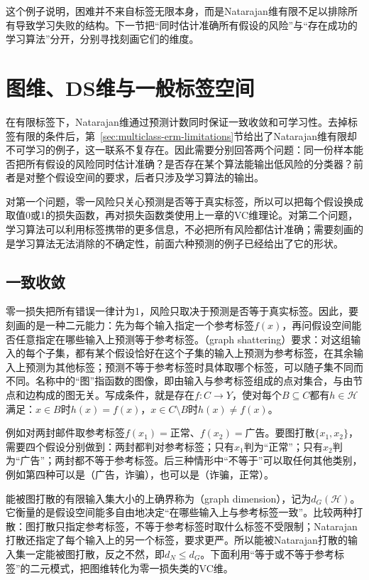 这个例子说明，困难并不来自标签无限本身，而是Natarajan维有限不足以排除所有导致学习失败的结构。下一节把“同时估计准确所有假设的风险”与“存在成功的学习算法”分开，分别寻找刻画它们的维度。

\section{图维、DS维与一般标签空间}
\label{sec:general-multiclass-dimensions}
\label{sec:multiclass-sample-complexity}
在有限标签下，Natarajan维通过预测计数同时保证一致收敛和可学习性。去掉标签有限的条件后，第~\ref{sec:multiclass-erm-limitations}节给出了Natarajan维有限却不可学习的例子，这一联系不复存在。因此需要分别回答两个问题：同一份样本能否把所有假设的风险同时估计准确？是否存在某个算法能输出低风险的分类器？前者是对整个假设空间的要求，后者只涉及学习算法的输出。

对第一个问题，零一风险只关心预测是否等于真实标签，所以可以把每个假设换成取值0或1的损失函数，再对损失函数类使用上一章的VC维理论。对第二个问题，学习算法可以利用标签携带的更多信息，不必把所有风险都估计准确；需要刻画的是学习算法无法消除的不确定性，前面六种预测的例子已经给出了它的形状。

\subsection{一致收敛}

零一损失把所有错误一律计为1，风险只取决于预测是否等于真实标签。因此，要刻画的是一种二元能力：先为每个输入指定一个参考标签$f(x)$，再问假设空间能否任意指定在哪些输入上预测等于参考标签。（graph shattering）要求：对这组输入的每个子集，都有某个假设恰好在这个子集的输入上预测为参考标签，在其余输入上预测为其他标签；预测不等于参考标签时具体取哪个标签，可以随子集不同而不同。名称中的“图”指函数的图像，即由输入与参考标签组成的点对集合，与由节点和边构成的图无关。写成条件，就是存在$f:C\to Y$，使对每个$B\subseteq C$都有$h\in\mathcal H$满足：$x\in B$时$h(x)=f(x)$，$x\in C\setminus B$时$h(x)\neq f(x)$。

例如对两封邮件取参考标签$f(x_1)=\text{正常}$、$f(x_2)=\text{广告}$。要图打散$\{x_1,x_2\}$，需要四个假设分别做到：两封都判对参考标签；只有$x_1$判为“正常”；只有$x_2$判为“广告”；两封都不等于参考标签。后三种情形中“不等于”可以取任何其他类别，例如第四种可以是（广告，诈骗），也可以是（诈骗，正常）。

能被图打散的有限输入集大小的上确界称为（graph dimension），记为$d_G(\mathcal H)$。它衡量的是假设空间能多自由地决定“在哪些输入上与参考标签一致”。比较两种打散：图打散只指定参考标签，不等于参考标签时取什么标签不受限制；Natarajan打散还指定了每个输入上的另一个标签，要求更严。所以能被Natarajan打散的输入集一定能被图打散，反之不然，即$d_N\leq d_G$。下面利用“等于或不等于参考标签”的二元模式，把图维转化为零一损失类的VC维。

